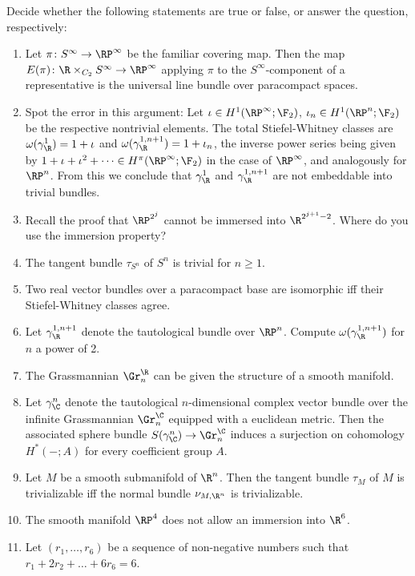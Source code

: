 \begin{questions*}
	Decide whether the following statements are true or false, or answer the question, respectively:
	\begin{enumerate}
		\item Let $\pi\colon S^\infty \to \RP^\infty$ be the familiar covering map.
			Then the map $E(\pi)\colon \R \times_{C_2} S^\infty \to \RP^\infty$ applying $\pi$ to the $S^\infty$-component of a representative is the universal line bundle over paracompact spaces.
		\item Spot the error in this argument:
			Let $\iota \in H^1(\RP^\infty; \F_2)$, $\iota_n \in H^1(\RP^n; \F_2)$ be the respective nontrivial elements.
			The total Stiefel-Whitney classes are $\omega(\gamma_\R^1) = 1 + \iota$ and $\omega(\gamma_\R^{1, n + 1}) = 1 + \iota_n$, the inverse power series being given by $1 + \iota + \iota^2 + \cdots \in H^\pi(\RP^\infty; \F_2)$ in the case of $\RP^\infty$, and analogously for $\RP^n$.
			From this we conclude that $\gamma_\R^1$ and $\gamma_\R^{1, n + 1}$ are not embeddable into trivial bundles.
		\item Recall the proof that $\RP^{2^j}$ cannot be immersed into $\R^{2^{j + 1} - 2}$. 
			Where do you use the immersion property?
		\item The tangent bundle $\tau_{S^n}$ of $S^n$ is trivial for $n \geq 1$.
		\item Two real vector bundles over a paracompact base are isomorphic iff their Stiefel-Whitney classes agree.
		\item Let $\gamma_\R^{1, n + 1}$ denote the tautological bundle over $\RP^n$.
			Compute $\omega(\gamma_\R^{1, n + 1})$ for $n$ a power of 2.
		\item The Grassmannian $\Gr_n^\R$ can be given the structure of a smooth manifold.
		\item Let $\gamma_\C^n$ denote the tautological $n$-dimensional complex vector bundle over the infinite Grassmannian $\Gr_n^\C$ equipped with a euclidean metric.
			Then the associated sphere bundle $S(\gamma_\C^n) \to \Gr_n^\C$ induces a surjection on cohomology $H^*({{-}}; A)$ for every coefficient group $A$.
		\item Let $M$ be a smooth submanifold of $\R^n$. 
			Then the tangent bundle $\tau_M$ of $M$ is trivializable iff the normal bundle $\nu_{M, \R^n}$ is trivializable.
		\item The smooth manifold $\RP^4$ does not allow an immersion into $\R^6$.
		\item Let $(r_1, \ldots, r_6)$ be a sequence of non-negative numbers such that $r_1 + 2 r_2 + \ldots + 6 r_6 = 6$.

\end{enumerate}
\end{questions*}
